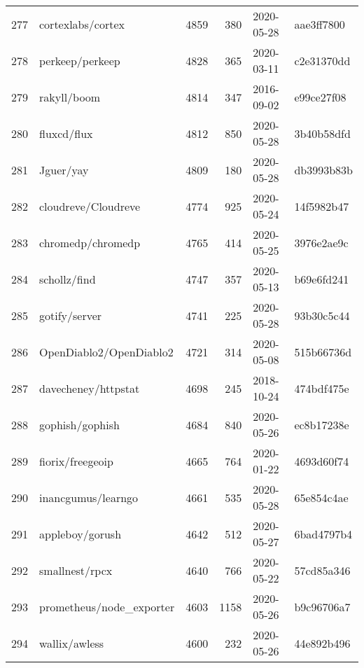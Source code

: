 \begin{longtable}{llrrll}
    277 &                                  cortexlabs/cortex &   4859 &    380 & 2020-05-28 &  aae3ff7800 \\
    278 &                                    perkeep/perkeep &   4828 &    365 & 2020-03-11 &  c2e31370dd \\
    279 &                                        rakyll/boom &   4814 &    347 & 2016-09-02 &  e99ce27f08 \\
    280 &                                        fluxcd/flux &   4812 &    850 & 2020-05-28 &  3b40b58dfd \\
    281 &                                          Jguer/yay &   4809 &    180 & 2020-05-28 &  db3993b83b \\
    282 &                                cloudreve/Cloudreve &   4774 &    925 & 2020-05-24 &  14f5982b47 \\
    283 &                                  chromedp/chromedp &   4765 &    414 & 2020-05-25 &  3976e2ae9c \\
    284 &                                       schollz/find &   4747 &    357 & 2020-05-13 &  b69e6fd241 \\
    285 &                                      gotify/server &   4741 &    225 & 2020-05-28 &  93b30c5c44 \\
    286 &                            OpenDiablo2/OpenDiablo2 &   4721 &    314 & 2020-05-08 &  515b66736d \\
    287 &                                davecheney/httpstat &   4698 &    245 & 2018-10-24 &  474bdf475e \\
    288 &                                    gophish/gophish &   4684 &    840 & 2020-05-26 &  ec8b17238e \\
    289 &                                   fiorix/freegeoip &   4665 &    764 & 2020-01-22 &  4693d60f74 \\
    290 &                                 inancgumus/learngo &   4661 &    535 & 2020-05-28 &  65e854c4ae \\
    291 &                                    appleboy/gorush &   4642 &    512 & 2020-05-27 &  6bad4797b4 \\
    292 &                                     smallnest/rpcx &   4640 &    766 & 2020-05-22 &  57cd85a346 \\
    293 &                           prometheus/node\_exporter &   4603 &   1158 & 2020-05-26 &  b9c96706a7 \\
    294 &                                      wallix/awless &   4600 &    232 & 2020-05-26 &  44e892b496 \\

\end{longtable}
